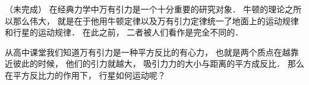 
\begin{issues}
\issueDraft
\end{issues}

（未完成）
在经典力学中万有引力是一个十分重要的研究对象． 牛顿的理论之所以那么伟大， 就是在于他用牛顿定律以及万有引力定律统一了地面上的运动规律和行星的运动规律． 在此之前， 二者被人们看作是完全不同的．

从高中课堂我们知道万有引力是一种平方反比的有心力， 也就是两个质点在越靠近彼此的时候， 他们的引力就越大， 吸引力力的大小与距离的平方成反比． 那么在平方反比力的作用下， 行星如何运动呢？

